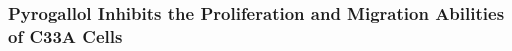 \documentclass[unnumsec,webpdf,contemporary,large]{oup-authoring-template}%
\theoremstyle{thmstyleone}%
\theoremstyle{thmstyletwo}%
\theoremstyle{thmstylethree}%
\begin{document}





\subsubsection*{Pyrogallol Inhibits the Proliferation and Migration Abilities of C33A Cells}
\end{document}
